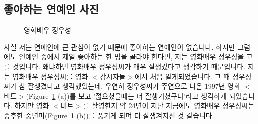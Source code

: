 \documentclass{article}
\begin{document}
\subsection{좋아하는 연예인 사진}
\label{sec3:subsec2}
\begin{figure}[!htbp]
	\begin{center}
		\caption{영화배우 정우성}
	\end{center}
	\label{fig:fig3}
\end{figure}
\noindent 사실 저는 연예인에 큰 관심이 없기 때문에 좋아하는 연예인이 없습니다. 하지만 그럼에도 연예인 중에서 제일 좋아하는 한 명을 골라야 한다면,
저는 영화배우 정우성을 고를 것입니다. 왜냐하면 영화배우 정우성씨가 매우 잘생겼다고 생각하기 때문입니다. 저는 영화배우 정우성씨를 영화 $<$감시자들$>$에서
처음 알게되었습니다. 그 때 정우성씨가 참 잘생겼다고 생각했었는데, 우연히 정우성씨가 주연으로 나온 1997년 영화 $<$비트$>$(Figure~\ref{fig:fig3} (a))를 보고
'젊으셨을떄는 더 잘생기셨구나'라고 생각하게 되었습니다. 하지만 영화 $<$비트$>$를 촬영한지 약 24년이 지난 지금에도 영화배우 정우성씨는
중후한 중년미(Figure~\ref{fig:fig3} (b))를 풍기게 되며 더 잘생겨지신 것 같습니다.
\end{document}
